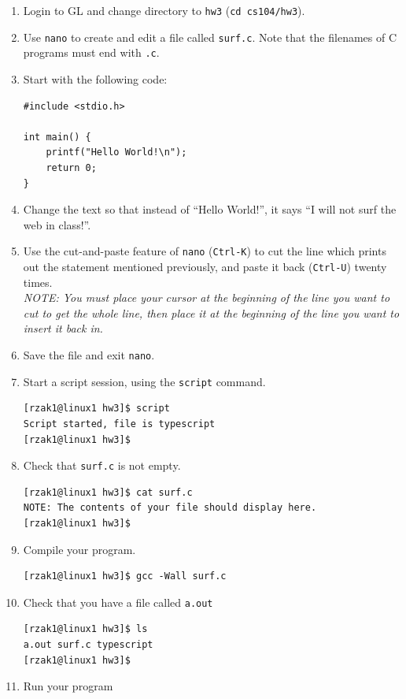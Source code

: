 \documentclass[letter,11pt]{article}
\begin{document}
\begin{enumerate}
    \item Login to GL and change directory to \texttt{hw3} (\texttt{cd cs104/hw3}).
    \item Use \texttt{nano} to create and edit a file called \texttt{surf.c}. Note that the filenames of C programs must end with \texttt{.c}.
    \item Start with the following code:
    \begin{verbatim}
#include <stdio.h>

int main() {
    printf("Hello World!\n");
    return 0;
}
    \end{verbatim}
    \item Change the text so that instead of ``Hello World!'', it says ``I will not surf the web in class!''.
    \item Use the cut-and-paste feature of \texttt{nano} (\texttt{Ctrl-K}) to cut the line which prints out the statement mentioned previously, and paste it back (\texttt{Ctrl-U}) twenty times. \\
    \textit{NOTE: You must place your cursor at the beginning of the line you want to cut to get the whole line, then place it at the beginning of the line you want to insert it back in.}
    \item Save the file and exit \texttt{nano}.
    \item Start a script session, using the \texttt{script} command.
    \begin{verbatim}
[rzak1@linux1 hw3]$ script
Script started, file is typescript
[rzak1@linux1 hw3]$
    \end{verbatim}
    \item Check that \texttt{surf.c} is not empty.
    \begin{verbatim}
[rzak1@linux1 hw3]$ cat surf.c
NOTE: The contents of your file should display here.
[rzak1@linux1 hw3]$
    \end{verbatim}
    \item Compile your program.
    \begin{verbatim}
[rzak1@linux1 hw3]$ gcc -Wall surf.c
    \end{verbatim}
    \item Check that you have a file called \texttt{a.out}
    \begin{verbatim}
[rzak1@linux1 hw3]$ ls
a.out surf.c typescript
[rzak1@linux1 hw3]$
    \end{verbatim}
    \item Run your program
    \begin{verbatim}

\end{verbatim}
\end{enumerate}
\end{document}
